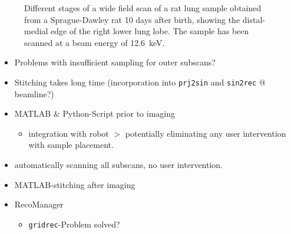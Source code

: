 \begin{figure}[p]
{
			\label{fig:merge-rec}
			}
	\caption{Different stages of a wide field scan of a rat lung sample obtained from a Sprague-Dawley rat 10 days after birth, showing the distal-medial edge of the right lower lung lobe. The sample has been scanned at a beam energy of \SI{12.6}{\kilo\electronvolt}.}
	\label{fig:wide field scan results}	
\end{figure}

\begin{itemize}
	\item Problems with insufficient sampling for outer subscans?
	\item Stitching takes long time (incorporation into \verb+prj2sin+ and \verb+sin2rec+ @ beamline?)
\end{itemize}

\begin{itemize}
	\item MATLAB \& Python-Script prior to imaging
	\begin{itemize}
		\item integration with robot $>$ potentially eliminating any user intervention with sample placement.
	\end{itemize}
	\item automatically scanning all subscans, no user intervention.
	\item MATLAB-stitching after imaging
	\item RecoManager
	\begin{itemize}
		\item \verb+gridrec+-Problem solved?
	\end{itemize}
\end{itemize}

